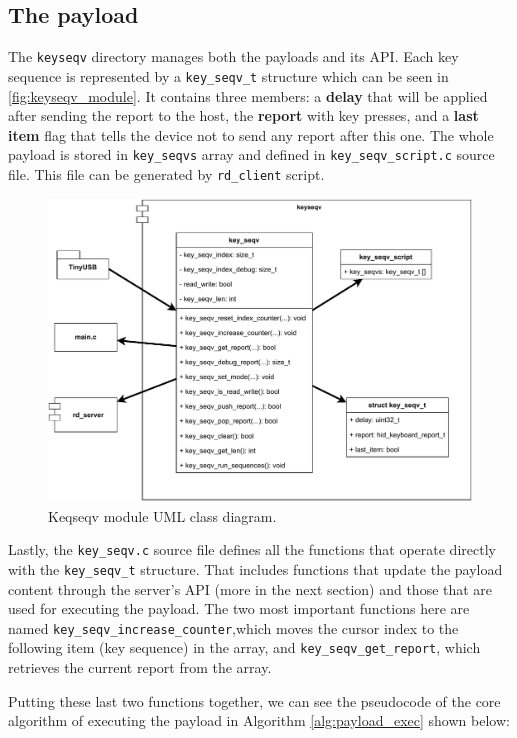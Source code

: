 \subsection{The payload}
\label{ssec:payload}
The \verb|keyseqv| directory manages both the payloads and its API. Each key sequence is represented by a \verb|key_seqv_t| structure which can be seen in \autoref{fig:keyseqv_module}. It contains three members: a \textbf{delay} that will be applied after sending the report to the host, the \textbf{report} with key presses, and a \textbf{last item} flag that tells the device not to send any report after this one. The whole payload is stored in \verb|key_seqvs| array and defined in \verb|key_seqv_script.c| source file. This file can be generated by \verb|rd_client| script.
\begin{figure}[ht]
    \centering
    \includegraphics[width=0.8\linewidth]{./obrazky-figures/keyseqv_module.pdf}
    \caption{Keqseqv module UML class diagram.}
    \label{fig:keyseqv_module}
\end{figure}

Lastly, the \verb|key_seqv.c| source file defines all the functions that operate directly with the \verb|key_seqv_t| structure. That includes functions that update the payload content through the server's API (more in the next section) and those that are used for executing the payload. The two most important functions here are named \verb|key_seqv_increase_counter|,\linebreak which moves the cursor index to the following item (key sequence) in the array, and \linebreak\verb|key_seqv_get_report|, which retrieves the current report from the array.

Putting these last two functions together, we can see the pseudocode of the core algorithm of executing the payload in Algorithm \ref{alg:payload_exec} shown below:


